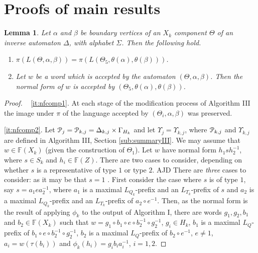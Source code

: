 \documentclass[a4paper,12pt]{article}
\renewcommand{\a}{\alpha }
\renewcommand{\b}{\beta }
\newcommand{\G}{\Gamma }
\newcommand{\D}{\Delta }
\newcommand{\T}{\Theta }
\renewcommand{\S}{\Sigma }
\renewcommand{\t}{\tau }
\newcommand{\U}{\Upsilon }
\newcommand{\cP}{{\cal{P}}}
\newtheorem{lemma}[theorem]{Lemma}
\numberwithin{equation}{section}
\numberwithin{figure}{section}
\newcommand{\FF}{\ensuremath{\mathbb{F}}}
\newcommand{\be}{\begin{enumerate}}
\newcommand{\ee}{\end{enumerate}}
\newenvironment{ajd1}{\noindent\color{red} AJD }{}
\newcommand{\ajd}[1]{\begin{ajd1} #1 \end{ajd1}}
\begin{document}
\section{Proofs of main results}\label{sec:proofs}
\begin{lemma}\label{lem:nfcomp}
Let $\a$ and $\b$ be boundary vertices of  an $X_k$ component $\T$ of
an inverse automaton $\D$, with alphabet $\S$. Then   the following hold.
\be
\item\label{it:nfcomp1}
  $\pi(L(\T,\a,\b))=\pi(L(\T_5,\theta(\a),\theta(\b)))$.
\item\label{it:nfcomp2} Let $w$ be a word
 which is accepted by the automaton $(\T, \a, \b)$. Then the
normal form of $w$ is accepted by $(\T_5, \theta(\a), \theta(\b))$.
\ee
\end{lemma}
\begin{proof} ~
\ref{it:nfcomp1}.
At each stage of the modification process of Algorithm
III the image under $\pi$ of the language accepted by $(\T_i,\a,\b)$  was
preserved.

\ref{it:nfcomp2}.
Let $\cP_j=\cP_{k,j}=\D_{k,j}\times \G_{H_k}$ and let $\U_j=\U_{k,j}$, where $\cP_{k,j}$ and $\U_{k,j}$
are defined in Algorithm III, Section \ref{sub:summaryIII}. 
We may assume that $w\in \FF(X_k)$ (given the construction of $\T_1$).
Let $w$ have normal form $h_1s h_2^{-1}$, where  $s\in S_k$ and $h_i\in \FF(Z)$.
There are two cases to consider, depending on whether $s$ is a
representative of type $1$ or type $2$. \ajd{There are \emph{three} cases
to consider: as it may be that $s=1$}. 
 First consider the case where $s$ is of type $1$, say
 $s= a_1 e a_2^{-1}$, where
$a_1$ is a maximal $L_{Q_k}$-prefix and an $L_{T_k}$-prefix of $s$ and
 $a_2$  is a maximal $L_{Q_k}$-prefix and an $L_{T_k}$-prefix of $a_2\circ e^{-1}$.
 Then, as the normal form is the result of applying $\phi_k$ to the
output of Algorithm I,
 there are words
$g_1, g_2, b_1$ and $b_2\in \FF(X_k)$ such that
$w=g_1\circ b_1\circ e \circ b_2^{-1}\circ g_2^{-1}$,
$g_i\in H_k$, $b_1$ is a maximal $L_Q$-prefix of
$b_1\circ e \circ b_2^{-1}\circ g_2^{-1}$,
$b_2$ is a maximal $L_Q$-prefix of $b_2\circ e^{-1}$, $e\neq 1$,
$a_i=w(\t(b_i))$ and $\phi_k(h_i)=g_ib_ia_i^{-1}$, $i=1,2$.


\end{proof}
\end{document}

